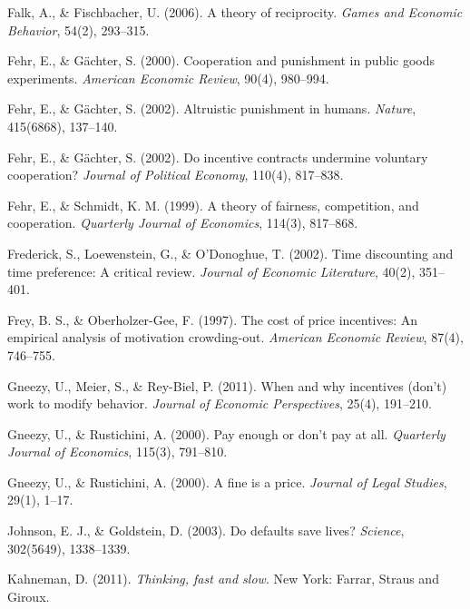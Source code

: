 \documentclass[11pt,a4paper]{article}
\begin{document}
\vspace{0.3cm}
Falk, A., \& Fischbacher, U. (2006). A theory of reciprocity. \textit{Games and Economic Behavior}, 54(2), 293--315.

\vspace{0.3cm}
Fehr, E., \& Gächter, S. (2000). Cooperation and punishment in public goods experiments. \textit{American Economic Review}, 90(4), 980--994.

\vspace{0.3cm}
Fehr, E., \& Gächter, S. (2002). Altruistic punishment in humans. \textit{Nature}, 415(6868), 137--140.

\vspace{0.3cm}
Fehr, E., \& Gächter, S. (2002). Do incentive contracts undermine voluntary cooperation? \textit{Journal of Political Economy}, 110(4), 817--838.

\vspace{0.3cm}
Fehr, E., \& Schmidt, K. M. (1999). A theory of fairness, competition, and cooperation. \textit{Quarterly Journal of Economics}, 114(3), 817--868.

\vspace{0.3cm}
Frederick, S., Loewenstein, G., \& O'Donoghue, T. (2002). Time discounting and time preference: A critical review. \textit{Journal of Economic Literature}, 40(2), 351--401.

\vspace{0.3cm}
Frey, B. S., \& Oberholzer-Gee, F. (1997). The cost of price incentives: An empirical analysis of motivation crowding-out. \textit{American Economic Review}, 87(4), 746--755.

\vspace{0.3cm}
Gneezy, U., Meier, S., \& Rey-Biel, P. (2011). When and why incentives (don't) work to modify behavior. \textit{Journal of Economic Perspectives}, 25(4), 191--210.

\vspace{0.3cm}
Gneezy, U., \& Rustichini, A. (2000). Pay enough or don't pay at all. \textit{Quarterly Journal of Economics}, 115(3), 791--810.

\vspace{0.3cm}
Gneezy, U., \& Rustichini, A. (2000). A fine is a price. \textit{Journal of Legal Studies}, 29(1), 1--17.

\vspace{0.3cm}
Johnson, E. J., \& Goldstein, D. (2003). Do defaults save lives? \textit{Science}, 302(5649), 1338--1339.

\vspace{0.3cm}
Kahneman, D. (2011). \textit{Thinking, fast and slow}. New York: Farrar, Straus and Giroux.
\end{document}
